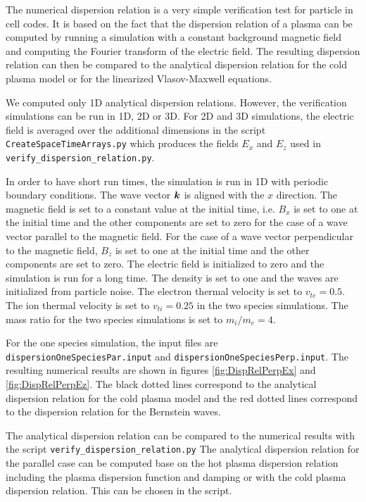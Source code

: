 \documentclass[11pt]{article}
\begin{document}
The numerical dispersion relation is a very simple verification test for particle in cell codes. It is based on the fact that the dispersion relation of a plasma can be computed by running a simulation with a constant background magnetic field and computing the Fourier transform of the electric field. The resulting dispersion relation can then be compared to the analytical dispersion relation for the cold plasma model or for the linearized Vlasov-Maxwell equations.

We computed only 1D analytical dispersion relations. However, the verification simulations can be run in 1D, 2D or 3D. For 2D and 3D simulations, the electric field is averaged over the additional dimensions in the script \verb|CreateSpaceTimeArrays.py| which produces the fields $E_x$ and $E_z$ used in \verb|verify_dispersion_relation.py|. 


In order to have short run times, the simulation is run in 1D with periodic boundary conditions. The wave vector ${\boldsymbol k}$ is aligned with the $x$ direction. The magnetic field is set to a constant value at the initial time, i.e. $B_x$ is set to one at the initial time and the other components are set to zero for the case of a wave vector parallel to the magnetic field. For the case of a wave vector perpendicular to the magnetic field, $B_z$ is set to one at the initial time and the other components are set to zero.
The electric field is initialized to zero and the simulation is run for a long time. 
The density is set to one and the waves are initialized from particle noise.
The electron thermal velocity is set to $v_{te} = 0.5$. The ion thermal velocity is set to $v_{ti} = 0.25$ in the two species simulations. The mass ratio for the two species simulations is set to $m_i/m_e = 4$.

For the one species simulation, the input files are \verb|dispersionOneSpeciesPar.input| and \verb|dispersionOneSpeciesPerp.input|. The resulting numerical results are shown in figures \ref{fig:DispRelPerpEx} and \ref{fig:DispRelPerpEz}. The black dotted lines correspond to the analytical dispersion relation for the cold plasma model and the red dotted lines correspond to the dispersion relation for the Bernstein waves.

The analytical dispersion relation can be compared to the numerical results with the script \verb|verify_dispersion_relation.py|
The analytical dispersion relation for the parallel case can be computed base on the hot plasma dispersion relation including the plasma dispersion function and damping or with the cold plasma dispersion relation. This can be chosen in the script.
\end{document}
